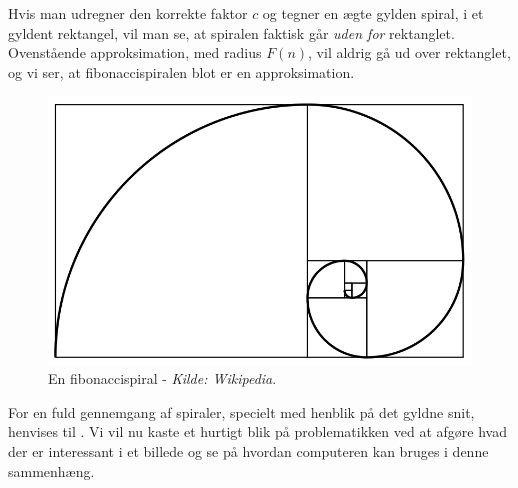 {Hvis man udregner den korrekte faktor $c$ og tegner en ægte gylden
spiral, i et gyldent rektangel, vil man se, at spiralen faktisk går
\emph{uden for} rektanglet\cite{Sharp2002}. Ovenstående approksimation,
med radius $F(n)$, vil aldrig gå ud over rektanglet, og vi ser, at
fibonaccispiralen blot er en approksimation.

\begin{figure}[!h]
    \centering
	\includegraphics[scale=0.35,angle=0]{afsnit/baggrund/billeder/Fibonacci_spiral}
	\caption[En fibonaccispiral]{En fibonaccispiral - \emph{Kilde: Wikipedia}.}
	\label{fibonacci_spiral}
\end{figure}

For en fuld gennemgang af spiraler, specielt med henblik på det gyldne
snit, henvises til \cite{Sharp2002}. Vi vil nu kaste et hurtigt blik på
problematikken ved at afgøre hvad der er interessant i et billede og se
på hvordan computeren kan bruges i denne sammenhæng.

}
